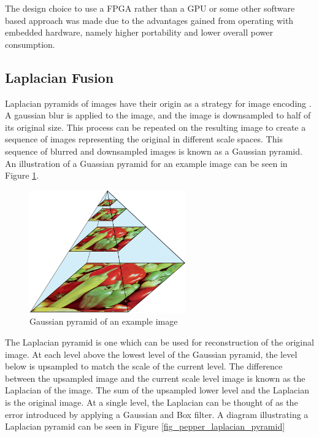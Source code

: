 \documentclass{article}
\begin{document}
The design choice to use a FPGA rather than a GPU or some other software based approach was made due to the advantages gained from operating with embedded hardware, namely higher portability and lower overall power consumption.

\subsection{Laplacian Fusion}

Laplacian pyramids of images have their origin as a strategy for image encoding \cite{burt_laplacian_1983}. A gaussian blur is applied to the image, and the image is downsampled to half of its original size. This process can be repeated on the resulting image to create a sequence of images representing the original in different scale spaces. This sequence of blurred and downsampled images is known as a Gaussian pyramid. An illustration of a Guassian pyramid for an example image can be seen in Figure \ref{fig_pepper_gaussian_pyramid}.

\begin{figure}[h]
	\centering
	\includegraphics[width=0.6\textwidth]{figures/peppers/gaussian_pyramid}
	\caption{Gaussian pyramid of an example image}
	\label{fig_pepper_gaussian_pyramid}
\end{figure}

The Laplacian pyramid is one which can be used for reconstruction of the original image. At each level above the lowest level of the Gaussian pyramid, the level below is upsampled to match the scale of the current level. The difference between the upsampled image and the current scale level image is known as the Laplacian of the image. The sum of the upsampled lower level and the Laplacian is the original image. At a single level, the Laplacian can be thought of as the error introduced by applying a Gaussian and Box filter. A diagram illustrating a Laplacian pyramid can be seen in Figure \ref{fig_pepper_laplacian_pyramid}
\end{document}
